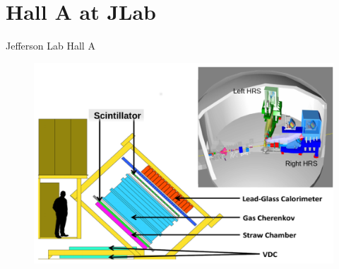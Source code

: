 \documentclass{beamer}
\begin{document}
\section{Hall A at JLab}
\begin{frame}
	\begin{block}{Jefferson Lab Hall A}
		\begin{figure}
			\includegraphics[width=12.0cm]{../images/HallaHRS.pdf}
		\end{figure}
	\end{block}
\end{frame}
\end{document}
